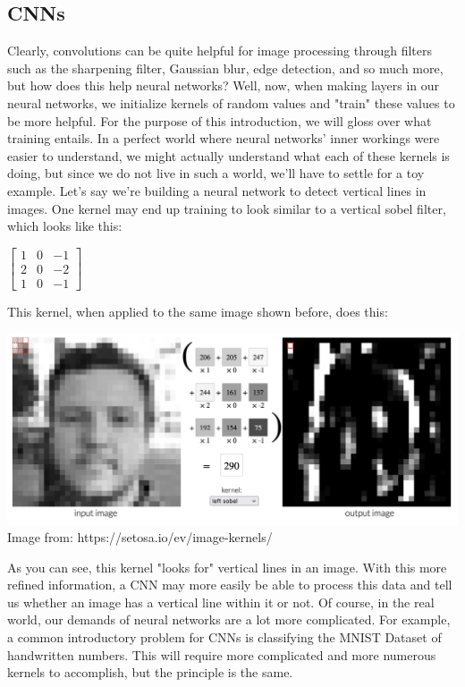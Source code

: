 \documentclass{article}
\begin{document}
\subsection{CNNs}
Clearly, convolutions can be quite helpful for image processing through filters such as the sharpening filter, Gaussian blur, edge detection, and so much more, but how does this help neural networks? Well, now, when making layers in our neural networks, we initialize kernels of random values and "train" these values to be more helpful. For the purpose of this introduction, we will gloss over what training entails. In a perfect world where neural networks' inner workings were easier to understand, we might actually understand what each of these kernels is doing, but since we do not live in such a world, we'll have to settle for a toy example. Let's say we're building a neural network to detect vertical lines in images. One kernel may end up training to look similar to a vertical sobel filter, which looks like this:\\
\begin{center}
    $\begin{bmatrix}
        1 & 0 & -1 \\
        2 & 0 & -2 \\
        1 & 0 & -1
    \end{bmatrix}$
\end{center}
This kernel, when applied to the same image shown before, does this:
\begin{center}
    \includegraphics[scale=0.22]{sobel.png}\\
    Image from: https://setosa.io/ev/image-kernels/
\end{center}
As you can see, this kernel "looks for" vertical lines in an image. With this more refined information, a CNN may more easily be able to process this data and tell us whether an image has a vertical line within it or not. Of course, in the real world, our demands of neural networks are a lot more complicated. For example, a common introductory problem for CNNs is classifying the MNIST Dataset of handwritten numbers. This will require more complicated and more numerous kernels to accomplish, but the principle is the same. 
\end{document}
